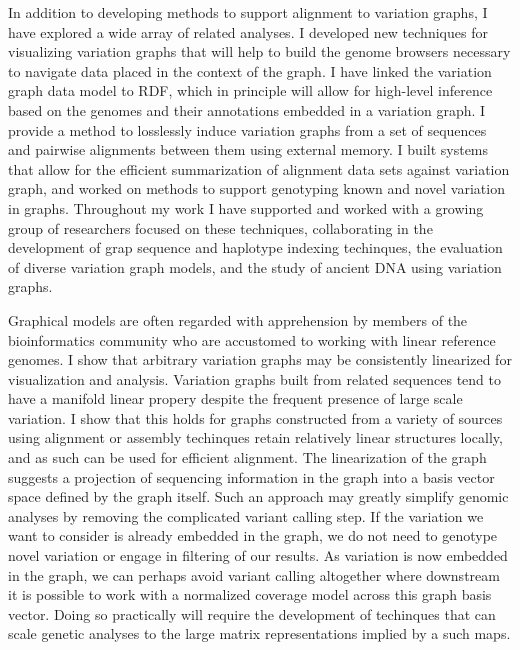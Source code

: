 In addition to developing methods to support alignment to variation graphs, I have explored a wide array of related analyses.
I developed new techniques for visualizing variation graphs that will help to build the genome browsers necessary to navigate data placed in the context of the graph.
I have linked the variation graph data model to RDF, which in principle will allow for high-level inference based on the genomes and their annotations embedded in a variation graph. 
I provide a method to losslessly induce variation graphs from a set of sequences and pairwise alignments between them using external memory.
I built systems that allow for the efficient summarization of alignment data sets against variation graph, and worked on methods to support genotyping known and novel variation in graphs.
Throughout my work I have supported and worked with a growing group of researchers focused on these techniques, collaborating in the development of grap sequence and haplotype indexing techinques, the evaluation of diverse variation graph models, and the study of ancient DNA using variation graphs.

Graphical models are often regarded with apprehension by members of the bioinformatics community who are accustomed to working with linear reference genomes.
I show that arbitrary variation graphs may be consistently linearized for visualization and analysis.
Variation graphs built from related sequences tend to have a manifold linear propery despite the frequent presence of large scale variation.
I show that this holds for graphs constructed from a variety of sources using alignment or assembly techinques retain relatively linear structures locally, and as such can be used for efficient alignment.
The linearization of the graph suggests a projection of sequencing information in the graph into a basis vector space defined by the graph itself.
Such an approach may greatly simplify genomic analyses by removing the complicated variant calling step.
If the variation we want to consider is already embedded in the graph, we do not need to genotype novel variation or engage in filtering of our results.
As variation is now embedded in the graph, we can perhaps avoid variant calling altogether where downstream it is possible to work with a normalized coverage model across this graph basis vector.
Doing so practically will require the development of techinques that can scale genetic analyses to the large matrix representations implied by a such maps.

